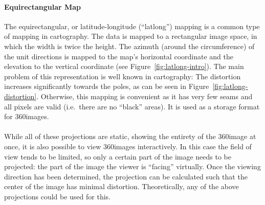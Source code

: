 \paragraph{Equirectangular Map}
The equirectangular, or latitude-longitude (``latlong'') mapping is a common type of mapping in cartography. The data is mapped to a rectangular image space, in which the width is twice the height. The azimuth (around the circumference) of the unit directions is mapped to the map's horizontal coordinate and the elevation to the vertical coordinate (see Figure~\ref{fig:latlong-intro}). The main problem of this representation is well known in cartography: The distortion increases significantly towards the poles, as can be seen in Figure~\ref{fig:latlong-distortion}. Otherwise, this mapping is convenient as it has very few seams and all pixels are valid (i.e.\ there are no ``black'' areas). It is used as a storage format for 360\degree images.
\cite[p. 538]{hdrbook}

\paragraph*{}
While all of these projections are static, showing the entirety of the 360\degree image at once, it is also possible to view 360\degree images interactively. In this case the field of view tends to be limited, so only a certain part of the image needs to be projected: the part of the image the viewer is ``facing'' virtually. Once the viewing direction has been determined, the projection can be calculated such that the center of the image has minimal distortion. Theoretically, any of the above projections could be used for this. 

